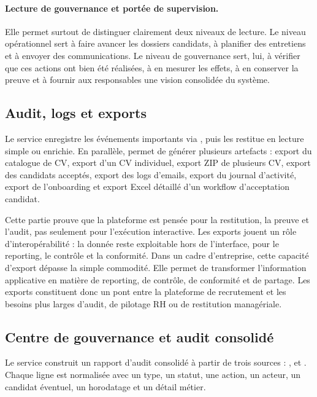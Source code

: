\paragraph{Lecture de gouvernance et portée de supervision.}

Elle permet surtout de distinguer clairement deux niveaux de lecture. Le niveau opérationnel sert à faire avancer les dossiers candidats, à planifier des entretiens et à envoyer des communications. Le niveau de gouvernance sert, lui, à vérifier que ces actions ont bien été réalisées, à en mesurer les effets, à en conserver la preuve et à fournir aux responsables une vision consolidée du système.


\subsection{Audit, logs et exports}
Le service  enregistre les événements importants via , puis les restitue en lecture simple ou enrichie. En parallèle,  permet de générer plusieurs artefacts : export du catalogue de CV, export d'un CV individuel, export ZIP de plusieurs CV, export des candidats acceptés, export des logs d'emails, export du journal d'activité, export de l'onboarding et export Excel détaillé d'un workflow d'acceptation candidat.

Cette partie prouve que la plateforme est pensée pour la restitution, la preuve et l'audit, pas seulement pour l'exécution interactive. Les exports jouent un rôle d'interopérabilité : la donnée reste exploitable hors de l'interface, pour le reporting, le contrôle et la conformité.
Dans un cadre d'entreprise, cette capacité d'export dépasse la simple commodité. Elle permet de transformer l'information applicative en matière de reporting, de contrôle, de conformité et de partage. Les exports constituent donc un pont entre la plateforme de recrutement et les besoins plus larges d'audit, de pilotage RH ou de restitution managériale.

\subsection{Centre de gouvernance et audit consolidé}
Le service  construit un rapport d'audit consolidé à partir de trois sources : ,  et . Chaque ligne est normalisée avec un type, un statut, une action, un acteur, un candidat éventuel, un horodatage et un détail métier.


